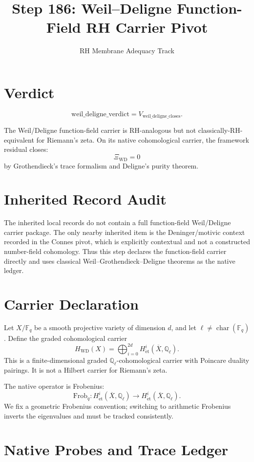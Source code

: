 \documentclass[11pt]{article}
\title{Step 186: Weil--Deligne Function-Field RH Carrier Pivot}
\author{RH Membrane Adequacy Track}
\date{}
\newcommand{\Fq}{\mathbb F_q}
\newcommand{\Qell}{\mathbb Q_\ell}
\newcommand{\Xbar}{\overline X}
\newcommand{\XiWD}{\Xi_{\mathrm{WD}}}
\begin{document}
\maketitle

\section*{Verdict}

\[
\boxed{\mathrm{weil\_deligne\_verdict}=V_{\mathrm{weil\_deligne\_closes}}.}
\]

The Weil/Deligne function-field carrier is RH-analogous but not
classically-RH-equivalent for Riemann's zeta.  On its native cohomological
carrier, the framework residual closes:
\[
\boxed{\XiWD=0}
\]
by Grothendieck's trace formalism and Deligne's purity theorem.

\section*{Inherited Record Audit}

The inherited local records do not contain a full function-field
Weil/Deligne carrier package.  The only nearby inherited item is the
Deninger/motivic context recorded in the Connes pivot, which is explicitly
contextual and not a constructed number-field cohomology.  Thus this step
declares the function-field carrier directly and uses classical
Weil--Grothendieck--Deligne theorems as the native ledger.

\section*{Carrier Declaration}

Let \(X/\Fq\) be a smooth projective variety of dimension \(d\), and let
\(\ell\ne \operatorname{char}(\Fq)\).  Define the graded cohomological carrier
\[
H_{\mathrm{WD}}(X)
=
\bigoplus_{i=0}^{2d}
H^i_{\mathrm{\acute et}}(\Xbar,\Qell).
\]
This is a finite-dimensional graded \(\Qell\)-cohomological carrier with
Poincare duality pairings.  It is not a Hilbert carrier for Riemann's zeta.

The native operator is Frobenius:
\[
\mathrm{Frob}_q:
H^i_{\mathrm{\acute et}}(\Xbar,\Qell)
\longrightarrow
H^i_{\mathrm{\acute et}}(\Xbar,\Qell).
\]
We fix a geometric Frobenius convention; switching to arithmetic Frobenius
inverts the eigenvalues and must be tracked consistently.

\section*{Native Probes and Trace Ledger}
\end{document}
